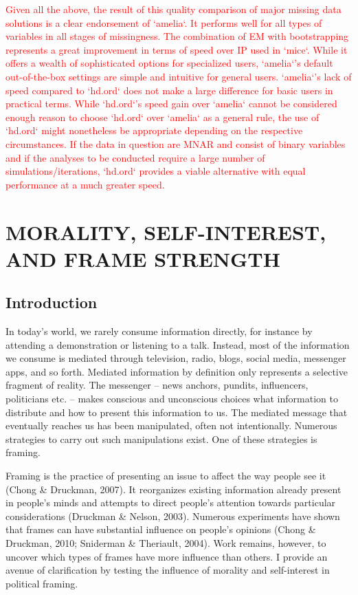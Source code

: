 \documentclass[12pt,econ]{sources/authesis}
\begin{document}
\textcolor{red}{Given all the above, the result of this quality comparison of major missing data solutions is a clear endorsement of `amelia`. It performs well for all types of variables in all stages of missingness. The combination of EM with bootstrapping represents a great improvement in terms of speed over IP used in `mice`. While it offers a wealth of sophisticated options for specialized users, `amelia`'s default out-of-the-box settings are simple and intuitive for general users. `amelia`'s lack of speed compared to `hd.ord` does not make a large difference for basic users in practical terms. While `hd.ord`'s speed gain over `amelia` cannot be considered enough reason to choose `hd.ord` over `amelia` as a general rule, the use of `hd.ord` might nonetheless be appropriate depending on the respective circumstances. If the data in question are MNAR and consist of binary variables and if the analyses to be conducted require a large number of simulations/iterations, `hd.ord` provides a viable alternative with equal performance at a much greater speed.}

\hypertarget{framing}{%
\chapter{MORALITY, SELF-INTEREST, AND FRAME STRENGTH}\label{framing}}

\hypertarget{framing-intro}{%
\section{Introduction}\label{framing-intro}}

In today's world, we rarely consume information directly, for instance by attending a demonstration or listening to a talk. Instead, most of the information we consume is mediated through television, radio, blogs, social media, messenger apps, and so forth. Mediated information by definition only represents a selective fragment of reality. The messenger -- news anchors, pundits, influencers, politicians etc. -- makes conscious and unconscious choices what information to distribute and how to present this information to us. The mediated message that eventually reaches us has been manipulated, often not intentionally. Numerous strategies to carry out such manipulations exist. One of these strategies is framing.

Framing is the practice of presenting an issue to affect the way people see it (Chong \& Druckman, 2007). It reorganizes existing information already present in people's minds and attempts to direct people's attention towards particular considerations (Druckman \& Nelson, 2003). Numerous experiments have shown that frames can have substantial influence on people's opinions (Chong \& Druckman, 2010; Sniderman \& Theriault, 2004). Work remains, however, to uncover which types of frames have more influence than others. I provide an avenue of clarification by testing the influence of morality and self-interest in political framing.
\end{document}

